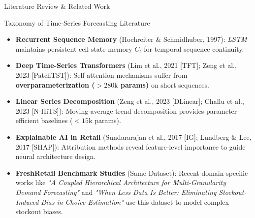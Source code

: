 \documentclass[10pt, aspectratio=169]{beamer}
\begin{document}
\begin{frame}{Literature Review \& Related Work}
  \begin{block}{Taxonomy of Time-Series Forecasting Literature}
    \small
    \begin{itemize}
      \item \textbf{Recurrent Sequence Memory} (Hochreiter \& Schmidhuber, 1997):
        \textit{LSTM} maintains persistent cell state memory $C_t$ for temporal sequence continuity.
      \item \textbf{Deep Time-Series Transformers} (Lim et al., 2021 [TFT]; Zeng et al., 2023 [PatchTST]):
        Self-attention mechanisms suffer from \textbf{overparameterization ($>280\text{k}$ params)} on short sequences.
      \item \textbf{Linear Series Decomposition} (Zeng et al., 2023 [DLinear]; Challu et al., 2023 [N-HiTS]):
        Moving-average trend decomposition provides parameter-efficient baselines ($<15\text{k}$ params).
      \item \textbf{Explainable AI in Retail} (Sundararajan et al., 2017 [IG]; Lundberg \& Lee, 2017 [SHAP]):
        Attribution methods reveal feature-level importance to guide neural architecture design.
      \item \textbf{FreshRetail Benchmark Studies} (Same Dataset):
        Recent domain-specific works like \textit{"A Coupled Hierarchical Architecture for Multi-Granularity Demand Forecasting"} and \textit{"When Less Data Is Better: Eliminating Stockout-Induced Bias in Choice Estimation"} use this dataset to model complex stockout biases.
    \end{itemize}
  \end{block}
\end{frame}
\end{document}
